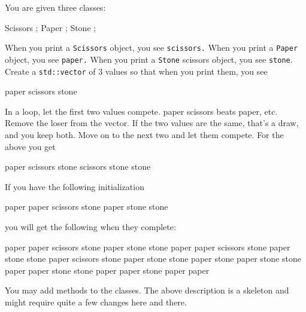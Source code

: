 \begin{ex} You are given three classes:

\begin{console}
Scissors
{};
Paper
{};
Stone
{};
\end{console}

When you print a \verb!Scissors! object, you see \verb!scissors.! When you print a \verb!Paper! object, you see \verb!paper.! When you print a \verb!Stone! scissors object, you see \verb!stone!. Create a \verb!std::vector! of 3 values so that when you print them, you see

\begin{console}
paper scissors stone
\end{console}

In a loop, let the first two values compete. paper scissors beats paper, etc. Remove the loser from the vector. If the two values are the same, that's a draw, and you keep both. Move on to the next two and let them compete. For the above you get

\begin{console}
paper scissors stone
scissors stone
stone
\end{console}

If you have the following initialization

\begin{console}
paper paper scissors stone paper stone stone
\end{console}

you will get the following when they complete:

\begin{console}
paper paper scissors stone paper stone stone
paper paper scissors stone paper stone stone
paper scissors stone paper stone stone
paper stone paper stone stone
paper paper stone stone
paper paper stone
paper paper
\end{console}

You may add methods to the classes. The above description is a skeleton and might require quite a few changes here and there.
\end{ex}
